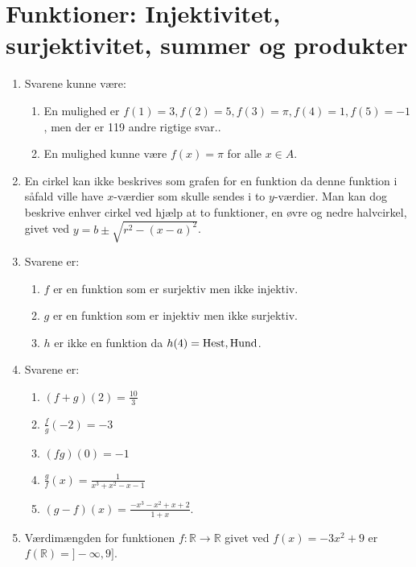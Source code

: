 \newpage
\section{Funktioner: Injektivitet, surjektivitet, summer og produkter}
\begin{enumerate}
	\item  Svarene kunne være:
	\begin{enumerate}
		\item En mulighed er $ f(1)=3,f(2)=5,f(3)=\pi,f(4)=1,f(5)=-1 $, men der er 119 andre rigtige svar..
		\item En mulighed kunne være $f(x)=\pi$ for alle $x\in A$.
	\end{enumerate}
	
	
	\item En cirkel kan ikke beskrives som grafen for en funktion da denne funktion i såfald ville have $x$-værdier som skulle sendes i to $y$-værdier. Man kan dog beskrive enhver cirkel ved hjælp at to funktioner, en øvre og nedre halvcirkel, givet ved $y=b\pm \sqrt{r^2-(x-a)^2}$. 
	
	\item Svarene er:
	\begin{enumerate}
		\item $f$ er en funktion som er surjektiv men ikke injektiv.
		\item $g$ er en funktion som er injektiv men ikke surjektiv.
		\item $h$ er ikke en funktion da $h(4)=\textup{Hest},\textup{Hund}$.
	\end{enumerate}

	\item Svarene er:
	\begin{enumerate}
		\item $(f+g)(2)=\frac{10}{3}$
		\item $ \frac{f}{g}(-2) =-3$
		\item $(fg)(0)=-1$
		\item $\frac{g}{f}(x)=\frac{1}{x^3+x^2-x-1}$
		\item $(g-f)(x)=\frac{-x^3-x^2+x+2}{1+x}$.
	\end{enumerate}

	\item Værdimængden for funktionen $f\colon \mathbb{R}\to \mathbb{R}$ givet ved $f(x)=-3x^2+9$ er $f(\mathbb{R})=]-\infty,9]$.
	

\end{enumerate}
